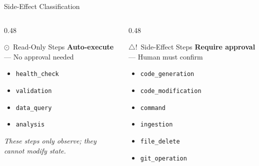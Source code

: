 \documentclass[aspectratio=169]{beamer}
\newcommand{\faEye}{$\odot$}
\newcommand{\faExclamationTriangle}{$\triangle$!}
\begin{document}
\begin{frame}{Side-Effect Classification}
\begin{columns}[T]
\begin{column}{0.48\textwidth}
\begin{block}{\textcolor{readonlyblue}{\faEye\ Read-Only Steps}}
\textbf{Auto-execute} — No approval needed
\vspace{0.3em}
\begin{itemize}
    \item \texttt{health\_check}
    \item \texttt{validation}
    \item \texttt{data\_query}
    \item \texttt{analysis}
\end{itemize}
\vspace{0.3em}
\footnotesize\textit{These steps only observe; they cannot modify state.}
\end{block}
\end{column}

\begin{column}{0.48\textwidth}
\begin{alertblock}{\textcolor{sideeffectred}{\faExclamationTriangle\ Side-Effect Steps}}
\textbf{Require approval} — Human must confirm
\vspace{0.3em}
\begin{itemize}
    \item \texttt{code\_generation}
    \item \texttt{code\_modification}
    \item \texttt{command}
    \item \texttt{ingestion}
    \item \texttt{file\_delete}
    \item \texttt{git\_operation}
\end{itemize}
\end{alertblock}
\end{column}
\end{columns}

\vspace{0.5em}
\begin{center}
\end{center}
\end{frame}
\end{document}
